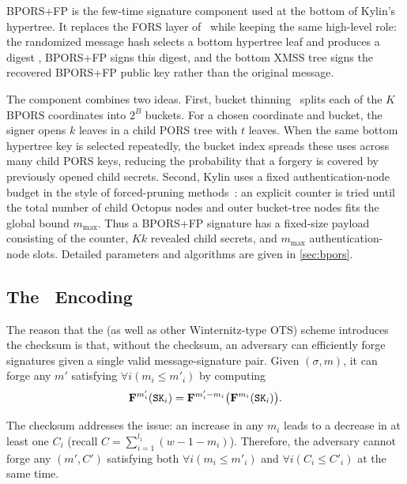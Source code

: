 BPORS+FP is the few-time signature component used at the bottom of Kylin's
hypertree.  It replaces the FORS layer of \SPHINCSP\ while keeping the same
high-level role: the randomized message hash selects a bottom hypertree leaf
and produces a digest \md, BPORS+FP signs this digest, and the bottom XMSS tree
signs the recovered BPORS+FP public key rather than the original message.

The component combines two ideas.  First, bucket thinning~\cite{bucketthinning}
splits each of the $K$ BPORS coordinates into $2^B$ buckets.  For a chosen
coordinate and bucket, the signer opens $k$ leaves in a child PORS tree with
$t$ leaves.  When the same bottom hypertree key is selected repeatedly, the
bucket index spreads these uses across many child PORS keys, reducing the
probability that a forgery is covered by previously opened child secrets.
Second, Kylin uses a fixed authentication-node budget in the style of
forced-pruning methods~\cite{EPRINT:AbrKat25}: an explicit counter is tried
until the total number of child Octopus nodes and outer bucket-tree nodes fits
the global bound $m_{\max}$.  Thus a BPORS+FP signature has a fixed-size
payload consisting of the counter, $Kk$ revealed child secrets, and
$m_{\max}$ authentication-node slots.  Detailed parameters and algorithms are
given in \cref{sec:bpors}.

\subsection{The \WOTSP~Encoding}

The reason that the \WOTSP (as well as other Winternitz-type OTS) scheme
introduces the checksum is that, without the checksum, an adversary can
efficiently forge signatures given a single valid message-signature pair.
Given $(\sigma,m)$, it can forge any $m'$ satisfying
$\forall i(m_i\leq m'_i)$ by computing
\[
    \hashF^{m'_i}(\sk_i)
    =
    \hashF^{m'_i-m_i}\big(\hashF^{m_i}(\sk_i)\big).
\]

The checksum addresses the issue: an increase in any $m_i$ leads to a decrease in at least one $C_i$ (recall $C=\sum_{i=1}^{l_1}(w-1-m_i)$). Therefore, the adversary cannot forge any $(m',C')$ satisfying both $\forall i(m_i\leq m'_i)$ and $\forall i(C_i\leq C'_i)$ at the same time.






